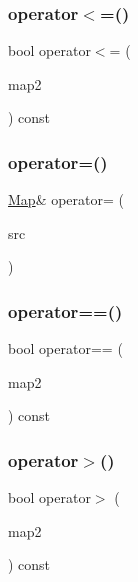 \mbox{\label{classMap_a91d581dcc2a8ff2a83aa7854e9166dc9}} 
\subsubsection{\texorpdfstring{operator$<$=()}{operator<=()}}
{\footnotesize\ttfamily bool operator$<$= (\begin{DoxyParamCaption}\item[{const \mbox{\hyperlink{classMap}{Map}}$<$ Key\+Type, Value\+Type $>$ \&}]{map2 }\end{DoxyParamCaption}) const}

\mbox{\label{classMap_a70c7b38b7d69581be6cbfe53ca06f725}} 
\subsubsection{\texorpdfstring{operator=()}{operator=()}}
{\footnotesize\ttfamily \mbox{\hyperlink{classMap}{Map}}\& operator= (\begin{DoxyParamCaption}\item[{const \mbox{\hyperlink{classMap}{Map}}$<$ Key\+Type, Value\+Type $>$ \&}]{src }\end{DoxyParamCaption})\hspace{0.3cm}{\ttfamily [inline]}}

\mbox{\label{classMap_a5dda0121a37510aec1dcf9cd53ba21e8}} 
\subsubsection{\texorpdfstring{operator==()}{operator==()}}
{\footnotesize\ttfamily bool operator== (\begin{DoxyParamCaption}\item[{const \mbox{\hyperlink{classMap}{Map}}$<$ Key\+Type, Value\+Type $>$ \&}]{map2 }\end{DoxyParamCaption}) const}

\mbox{\label{classMap_a991d18b9e2b2e21bd63f6fae462f56f6}} 
\subsubsection{\texorpdfstring{operator$>$()}{operator>()}}
{\footnotesize\ttfamily bool operator$>$ (\begin{DoxyParamCaption}\item[{const \mbox{\hyperlink{classMap}{Map}}$<$ Key\+Type, Value\+Type $>$ \&}]{map2 }\end{DoxyParamCaption}) const}


